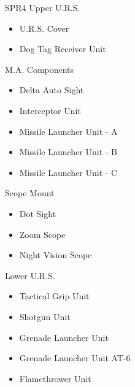 \begin{spr4}{SPR4}
    Upper U.R.S.
    \begin{itemize}
        \item U.R.S. Cover
        \item Dog Tag Receiver Unit
    \end{itemize}

    M.A. Components
    \begin{itemize}
        \item Delta Auto Sight
        \item Interceptor Unit
        \item Missile Launcher Unit - A
        \item Missile Launcher Unit - B
        \item Missile Launcher Unit - C
    \end{itemize}

    Scope Mount
    \begin{itemize}
        \item Dot Sight
        \item Zoom Scope
        \item Night Vision Scope
    \end{itemize}

    Lower U.R.S.
    \begin{itemize}
        \item Tactical Grip Unit
        \item Shotgun Unit
        \item Grenade Launcher Unit
        \item Grenade Launcher Unit AT-6
        \item Flamethrower Unit
    \end{itemize}
\end{spr4}
